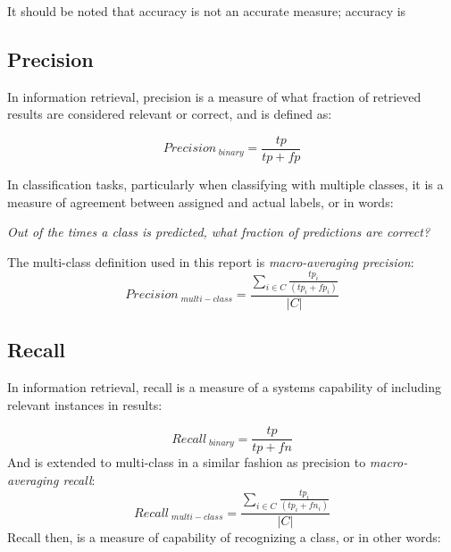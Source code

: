 \documentclass[a4paper,11pt]{kth-mag}
\begin{document}
It should be noted that accuracy is not an accurate measure; accuracy is 





\subsection{Precision}
In information retrieval, precision is a measure of what fraction of retrieved
results are considered relevant or correct, and is defined as\cite{rijsbergen1979v}:

\begin{equation} \label{eq:precision}
Precision_{\;binary} =  \frac{tp}{tp + fp}
\end{equation}

In classification tasks, particularly when classifying with multiple classes,
it is a measure of agreement between assigned and actual labels,
or in words:

\emph{Out of the times a class is predicted, what fraction of predictions are correct?}


The multi-class definition used in this report is \emph{macro-averaging precision}\cite{sokolova2009systematic}:
\begin{equation} \label{eq:multiprecision}
Precision_{\;multi-class} =  \frac{\sum_{i \in C} \frac{ tp_i}{(tp_i + fp_i)}}{|C|}
\end{equation}


\subsection{Recall}
In information retrieval, recall is a measure of a systems capability of including
relevant instances in results\cite{rijsbergen1979v}:

\begin{equation} \label{eq:recall}
Recall_{\;binary} = \frac{tp}{tp + fn}
\end{equation}
And is extended to multi-class in a similar fashion as precision to \emph{macro-averaging recall}\cite{sokolova2009systematic}:
\begin{equation} \label{eq:multirecall}
Recall_{\;multi-class} =  \frac{\sum_{i \in C} \frac{ tp_i}{(tp_i + fn_i)}}{|C|}
\end{equation}
Recall then, is a measure of capability of recognizing a class, or in other words:
\end{document}
